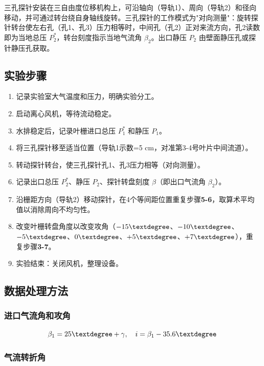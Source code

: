 三孔探针安装在三自由度位移机构上，可沿轴向（导轨1）、周向（导轨2）和径向移动，并可通过转台绕自身轴线旋转。三孔探针的工作模式为"对向测量"：旋转探针转台使左右孔（孔1、孔3）压力相等时，中间孔（孔2）正对来流方向，孔2读数即为当地总压 $P_2^*$，转台刻度指示当地气流角 $\beta_2$。出口静压 $P_2$ 由壁面静压孔或探针静压孔获取。

\subsection{实验步骤}

\begin{enumerate}
    \item 记录实验室大气温度和压力，明确实验分工。
    \item 启动离心风机，等待流动稳定。
    \item 水排稳定后，记录叶栅进口总压 $P_1^*$ 和静压 $P_1$。
    \item 将三孔探针移至适当位置（导轨1示数=5 cm，对准第3-4号叶片中间流道）。
    \item 转动探针转台，使三孔探针孔1、孔3压力相等（对向测量）。
    \item 记录出口总压 $P_2^*$、静压 $P_2$、探针转盘刻度 $\beta$（即出口气流角 $\beta_2$）。
    \item 沿栅距方向（导轨2）移动探针，在4个等间距位置重复步骤\textbf{5-6}，取算术平均值以消除周向不均匀性。
    \item 改变叶栅转盘角度以改变攻角（$-15\textdegree$、$-10\textdegree$、$-5\textdegree$、$0\textdegree$、$+5\textdegree$、$+7\textdegree$），重复步骤\textbf{3-7}。
    \item 实验结束：关闭风机，整理设备。
\end{enumerate}

\subsection{数据处理方法}

\subsubsection{进口气流角和攻角}

\begin{equation}
    \beta_1 = 25\textdegree + \gamma, \quad i = \beta_1 - 35.6\textdegree
\end{equation}

\subsubsection{气流转折角}

